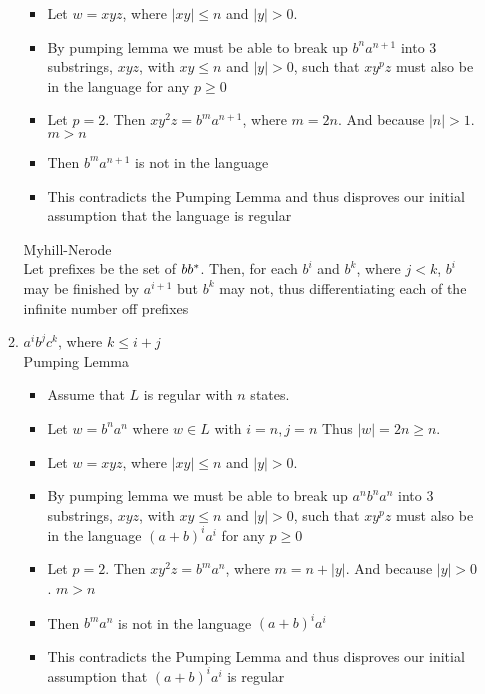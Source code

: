 \begin{enumerate}
\begin{enumerate}
\begin{itemize}
		\item Let $w = xyz$, where $|xy| \leq n$ and $|y| > 0$.
		
		\item By pumping lemma we must be able to break up $b^na^{n+1}$ into 3 substrings, $xyz$, with $xy \leq n$ and $|y| > 0$, such that $xy^pz$ must also be in the language for any $p \geq 0$
		
		\item Let $p = 2$. Then $xy^2z = b^ma^{n+1}$, where $m = 2n$.  And because $|n| > 1$. $m>n$
		
		\item Then $b^ma^{n+1}$ is not in the language
		
		\item This contradicts the Pumping Lemma and thus disproves our initial assumption that the language is regular
		
	\end{itemize}
Myhill-Nerode\\
Let prefixes be the set of $bb{}^\ast$.  Then, for each $b^i$ and $b^k$, where $ j < k$, $b^i$ may be finished by $a^{i+1}$ but $b^k$ may not, thus differentiating each of the infinite number off prefixes
    
    
	\item $a^ib^jc^k$, where $k \leq i+j$
	\\Pumping Lemma
\begin{itemize}
	\item 	Assume that $L$ is regular with $n$ states.  	
	\item Let $w = b^na^n$ where $w \in L$ with $i=n, j=n$ Thus $|w| = 2n  \geq n$.
	
	\item Let $w = xyz$, where $|xy| \leq n$ and $|y| > 0$.
	
	\item By pumping lemma we must be able to break up $a^nb^na^n$ into 3 substrings, $xyz$, with $xy \leq n$ and $|y| > 0$, such that $xy^pz$ must also be in the language $(a + b)^ia^i$ for any $p \geq 0$
	
	\item Let $p = 2$. Then $xy^2z = b^ma^n$, where $m = n + |y|$.  And because $|y| > 0$. $m>n$
	
	\item Then $b^ma^n$ is not in the language $(a + b)^ia^i$
	
	\item This contradicts the Pumping Lemma and thus disproves our initial assumption that $(a + b)^ia^i$ is regular
	

\end{itemize}
\end{enumerate}
\end{enumerate}
